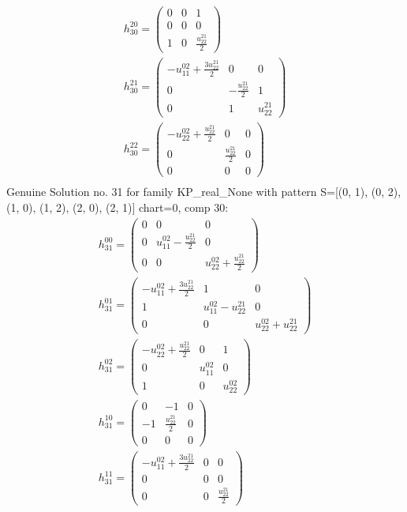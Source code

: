\documentclass[a4paper, 11pt, twoside, onecolumn]{article}
\begin{document}
\begin{landscape}
\begin{gather*}
	 h_{30}^{20}=\begin{pmatrix}0 & 0 & 1\\0 & 0 & 0\\1 & 0 & \frac{u^{21}_{22}}{2}\end{pmatrix}\\ 
	 h_{30}^{21}=\begin{pmatrix}- u^{02}_{11} + \frac{3 u^{21}_{22}}{2} & 0 & 0\\0 & - \frac{u^{21}_{22}}{2} & 1\\0 & 1 & u^{21}_{22}\end{pmatrix}\\ 
	 h_{30}^{22}=\begin{pmatrix}- u^{02}_{22} + \frac{u^{21}_{22}}{2} & 0 & 0\\0 & \frac{u^{21}_{22}}{2} & 0\\0 & 0 & 0\end{pmatrix}\\ 
\end{gather*} 
Genuine Solution no. 31 for family KP_real_None with pattern S=[(0, 1), (0, 2), (1, 0), (1, 2), (2, 0), (2, 1)] chart=0, comp 30: 
\begin{gather*} 
	 h_{31}^{00}=\begin{pmatrix}0 & 0 & 0\\0 & u^{02}_{11} - \frac{u^{21}_{22}}{2} & 0\\0 & 0 & u^{02}_{22} + \frac{u^{21}_{22}}{2}\end{pmatrix}\\ 
	 h_{31}^{01}=\begin{pmatrix}- u^{02}_{11} + \frac{3 u^{21}_{22}}{2} & 1 & 0\\1 & u^{02}_{11} - u^{21}_{22} & 0\\0 & 0 & u^{02}_{22} + u^{21}_{22}\end{pmatrix}\\ 
	 h_{31}^{02}=\begin{pmatrix}- u^{02}_{22} + \frac{u^{21}_{22}}{2} & 0 & 1\\0 & u^{02}_{11} & 0\\1 & 0 & u^{02}_{22}\end{pmatrix}\\ 
	 h_{31}^{10}=\begin{pmatrix}0 & -1 & 0\\-1 & \frac{u^{21}_{22}}{2} & 0\\0 & 0 & 0\end{pmatrix}\\ 
	 h_{31}^{11}=\begin{pmatrix}- u^{02}_{11} + \frac{3 u^{21}_{22}}{2} & 0 & 0\\0 & 0 & 0\\0 & 0 & \frac{u^{21}_{22}}{2}\end{pmatrix}\\ 

\end{gather*}
\end{landscape}
\end{document}
